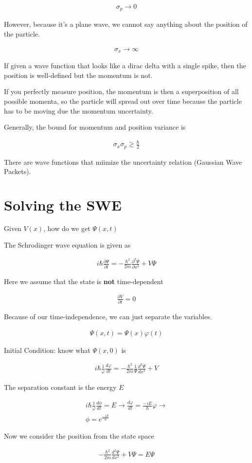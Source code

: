 \documentclass[fleqn]{report}
\newcommand{\del}{\partial}
\newcommand{\equations} [1] {
\begin{gather*}
#1
\end{gather*}
}
\begin{document}
\equations{
    \sigma_p \to 0
}

However, because it's a plane wave, we cannot say anything about the 
position of the particle. 

\equations{
    \sigma_x \to \infty
}

If given a wave function that looks like a dirac delta with a single 
spike, then the position is well-defined but the momentum is not. 

If you perfectly measure position, the momentum is then a superposition of 
all possible momenta, so the particle will spread out over time because 
the particle has to be moving due the momentum uncertainty.

Generally, the bound for momentum and position variance is 
\equations{
    \sigma_x 
    \sigma_p
    \geq 
    \frac{\hbar}{2}
}

There are wave functions that miimize the uncertainty relation 
(Gaussian Wave Packets).

\section{Solving the SWE}
Given $V(x)$, how do we get $\Psi(x, t)$

The Schrodinger wave equation is given as 
\equations{
    i \hbar \frac{\del \Psi}{\del t}
    =
    - \frac{\hbar^2}{2m} 
    \frac{\del^2 \Psi}{\del x^2}
    +
    V \Psi
}

Here we assume that the state is \textbf{not} time-dependent 
\equations{
    \frac{\del V}{\del t}
    =
    0
}

Because of our time-independence, we can just separate the variables. 
\equations{
    \Psi(x, t)
    =
    \Psi(x) \varphi(t) 
}

Initial Condition: know what $\Psi(x, 0)$ is

\equations{
    i \hbar \frac{1}{\varphi}
    \frac{d \varphi}{d t}
    =
    -\frac{\hbar^2}{2m}
    \frac{1}{\Psi}
    \frac{d^2 \Psi}{d x^2} 
    + V
}

The separation constant is the energy $E$ 

\equations{
    i \hbar \frac{1}{\varphi}
    \frac{d \phi}{d t}
    =
    E 
    \rightarrow 
    \frac{d \varphi}{d t}
    =
    \frac{-i E}{\hbar} \varphi
    \rightarrow 
    \\
    \phi 
    =
    e^{\frac{-iE}{h}}
}

Now we consider the position from the state space 
\equations{
    - \frac{\hbar^2}{2m}
    \frac{d^2 \Psi}{d x^2}
    +
    V \Psi
    =
    E \Psi
}
\end{document}
